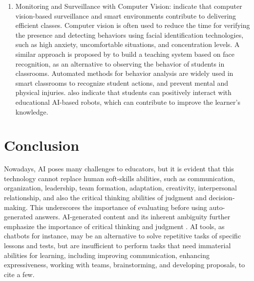 \documentclass[english]{textolivre}
\begin{document}
\begin{enumerate}
  \item Monitoring and Surveillance with Computer Vision: \textcite{Dimitriadou2022} indicate that computer vision-based surveillance and
  smart environments contribute to delivering efficient classes.
  Computer vision is often used to reduce the time for verifying the
  presence and detecting behaviors using facial identification
  technologies, such as high anxiety, uncomfortable situations, and
  concentration levels. A similar approach is proposed by \textcite{Shanshan2024} to build a teaching system based on face
  recognition, as an alternative to observing the behavior of students
  in classrooms. Automated methods for behavior analysis are widely used
  in smart classrooms to recognize student actions, and prevent mental
  and physical injuries. \textcite{Dimitriadou2022} also indicate
  that students can positively interact with educational AI-based
  robots, which can contribute to improve the learner's knowledge.
\end{enumerate}




\section{Conclusion}\label{sec-conc}
Nowadays, AI poses many challenges to educators, but it is evident that
this technology cannot replace human soft-skills abilities, such as
communication, organization, leadership, team formation, adaptation,
creativity, interpersonal relationship, and also the critical thinking
abilities of judgment and decision-making. This underscores the
importance of evaluating before using auto-generated answers.
AI-generated content and its inherent ambiguity further emphasize the
importance of critical thinking and judgment \cite{cao2023navigating}. AI tools,
as chatbots for instance, may be an alternative to solve repetitive
tasks of specific lessons and tests, but are insufficient to perform
tasks that need immaterial abilities for learning, including improving
communication, enhancing expressiveness, working with teams,
brainstorming, and developing proposals, to cite a few.
\end{document}
